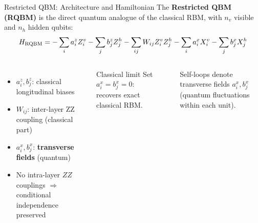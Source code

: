 \documentclass[aspectratio=169,10pt]{beamer}
\begin{document}
\begin{frame}{Restricted QBM: Architecture and Hamiltonian}
  The \textbf{Restricted QBM (RQBM)} is the direct quantum
  analogue of the classical RBM, with $n_v$ visible and
  $n_h$ hidden qubits:
  \[
    H_{\rm RQBM}
    = -\sum_i a_i^z Z_i^v - \sum_j b_j^z Z_j^h
      -\sum_{ij} W_{ij} Z_i^v Z_j^h
      -\sum_i a_i^x X_i^v - \sum_j b_j^x X_j^h
  \]

  \begin{columns}[T]
      \begin{itemize}\itemsep2pt
        \item $a_i^z, b_j^z$: classical longitudinal biases
        \item $W_{ij}$: inter-layer ZZ coupling (classical part)
        \item $a_i^x, b_j^x$: \textbf{transverse fields} (quantum)
        \item No intra-layer $ZZ$ couplings $\Rightarrow$
              conditional independence preserved
      \end{itemize}
      \begin{alertblock}{Classical limit}
        Set $a_i^x = b_j^x = 0$: recovers exact classical RBM.
      \end{alertblock}
      \begin{center}
      \end{center}
      {\small Self-loops denote transverse fields $a_i^x, b_j^x$
       (quantum fluctuations within each unit).}
  \end{columns}
\end{frame}
\end{document}
